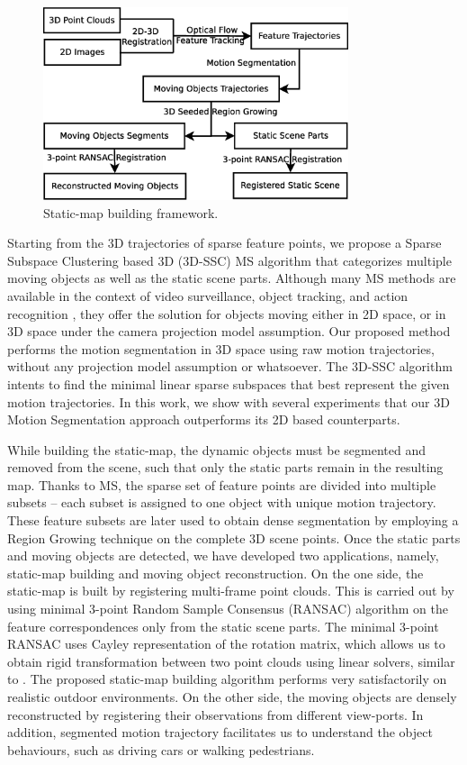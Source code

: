 \documentclass[10pt,twocolumn,letterpaper]{article}  %
\begin{document}
\begin{figure}
  \centering
 \includegraphics[width=0.8\textwidth]{image/pipeline.eps} 
		   \caption{Static-map building framework.}
  		 \label{fig:pipeline}    
\end{figure}

Starting from the 3D trajectories of sparse feature points, we propose a Sparse Subspace Clustering based 3D (3D-SSC) MS algorithm that categorizes multiple moving objects as well as the static scene parts. Although many MS methods are available in the context of video surveillance, object tracking, and action recognition \cite{c1}, they offer the solution for objects moving either in 2D space, or in 3D space under the camera projection model assumption. Our proposed method performs the motion segmentation in 3D space using raw motion trajectories, without any projection model assumption or whatsoever. The 3D-SSC algorithm intents to find the minimal linear sparse subspaces that best represent the given motion trajectories. In this work, we show with several experiments that our 3D Motion Segmentation approach outperforms its 2D based counterparts.

While building the static-map, the dynamic objects must be segmented and removed from the scene, such that only the static parts remain in the resulting map. Thanks to MS, the sparse set of feature points are divided into multiple subsets -- each subset is assigned to one object with unique motion trajectory. These feature subsets are later used to obtain dense segmentation by employing a Region Growing technique on the complete 3D scene points. Once the static parts and moving objects are detected, we have developed two applications, namely, static-map building and moving object reconstruction.  On the one side, the static-map is built by registering multi-frame point clouds. This is carried out by using minimal 3-point Random Sample Consensus (RANSAC) algorithm on the feature correspondences only from the static scene parts. The minimal 3-point RANSAC uses Cayley representation of the rotation matrix, which allows us to obtain rigid transformation between two point clouds using linear solvers, similar to \cite{c23}. The proposed static-map building algorithm performs very satisfactorily on realistic outdoor environments. On the other side, the moving objects are densely reconstructed by registering their observations from different view-ports. In addition, segmented motion trajectory facilitates us to understand the object behaviours, such as driving cars or walking pedestrians. 
\end{document}
